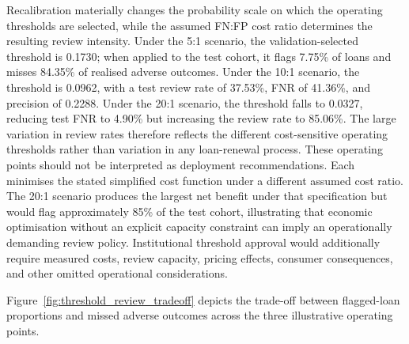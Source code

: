 \documentclass[10pt]{article}
\begin{document}
Recalibration materially changes the probability scale on which the operating thresholds are selected, while the assumed FN:FP cost ratio determines the resulting review intensity. Under the 5:1 scenario, the validation-selected threshold is 0.1730; when applied to the test cohort, it flags 7.75\% of loans and misses 84.35\% of realised adverse outcomes. Under the 10:1 scenario, the threshold is 0.0962, with a test review rate of 37.53\%, FNR of 41.36\%, and precision of 0.2288. Under the 20:1 scenario, the threshold falls to 0.0327, reducing test FNR to 4.90\% but increasing the review rate to 85.06\%. The large variation in review rates therefore reflects the different cost-sensitive operating thresholds rather than variation in any loan-renewal process. These operating points should not be interpreted as deployment recommendations. Each minimises the stated simplified cost function under a different assumed cost ratio. The 20:1 scenario produces the largest net benefit under that specification but would flag approximately 85\% of the test cohort, illustrating that economic optimisation without an explicit capacity constraint can imply an operationally demanding review policy. Institutional threshold approval would additionally require measured costs, review capacity, pricing effects, consumer consequences, and other omitted operational considerations.

Figure~\ref{fig:threshold_review_tradeoff} depicts the trade-off between flagged-loan proportions and missed adverse outcomes across the three illustrative operating points.
\end{document}
